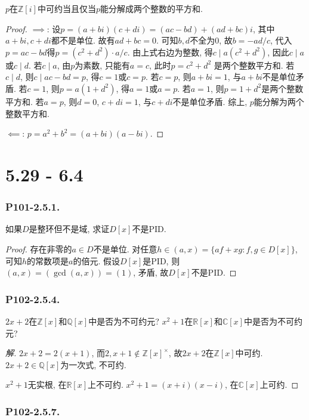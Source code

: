 \documentclass[12pt, a4paper, fontset=windows]{ctexart}
\newcommand{\C}{\mathbb{C}}
\newcommand{\Q}{\mathbb{Q}}
\newcommand{\R}{\mathbb{R}}
\newcommand{\Z}{\mathbb{Z}}
\newcommand{\unit}[1]{{#1}^\times}
\newenvironment{solution}{\begin{proof}[解]}{\end{proof}}
\begin{document}
$p$在$\Z[i]$中可约当且仅当$p$能分解成两个整数的平方和. 

\begin{proof}
$\implies$: 设$p=(a+bi)(c+di)=(ac-bd)+(ad+bc)i$, 
其中$a+bi,c+di$都不是单位. 
故有$ad+bc=0$. 可知$b,d$不全为$0$, 故$b=-ad/c$, 
代入$p=ac-bd$得$p=(c^2+d^2)\cdot a/c$. 由上式右边为整数, 
得$c\mid a(c^2+d^2)$, 因此$c\mid a$或$c\mid d$. 
若$c\mid a$, 由$p$为素数, 只能有$a=c$, 此时$p=c^2+d^2$
是两个整数平方和. 若$c\mid d$, 则$c\mid ac-bd=p$, 
得$c=1$或$c=p$. 若$c=p$, 则$a+bi=1$, 与$a+bi$不是单位矛盾. 
若$c=1$, 则$p=a(1+d^2)$, 得$a=1$或$a=p$. 若$a=1$, 
则$p=1+d^2$是两个整数平方和. 若$a=p$, 则$d=0$, $c+di=1$, 
与$c+di$不是单位矛盾. 综上, $p$能分解为两个整数平方和. 

$\impliedby$: $p=a^2+b^2=(a+bi)(a-bi)$. 
\end{proof}


\clearpage
\part{5.29 - 6.4}

\section*{P101-2.5.1.}

如果$D$是整环但不是域, 求证$D[x]$不是PID. 

\begin{proof}
存在非零的$a\in D$不是单位. 
对任意$h\in(a,x)=\{af+xg:f,g\in D[x]\}$, 
可知$h$的常数项是$a$的倍元. 假设$D[x]$是PID, 
则$(a,x)=(\gcd(a,x))=(1)$, 矛盾, 故$D[x]$不是PID. 
\end{proof}

\section*{P102-2.5.4.}

$2x+2$在$\Z[x]$和$\Q[x]$中是否为不可约元? 
$x^2+1$在$\R[x]$和$\C[x]$中是否为不可约元? 

\begin{solution}
$2x+2=2(x+1)$, 而$2,x+1\notin\unit{\Z[x]}$, 
故$2x+2$在$\Z[x]$中可约. $2x+2\in\Q[x]$为一次式, 不可约. 

$x^2+1$无实根, 在$\R[x]$上不可约. 
$x^2+1=(x+i)(x-i)$, 在$\C[x]$上可约. 
\end{solution}

\section*{P102-2.5.7.}
\end{document}
